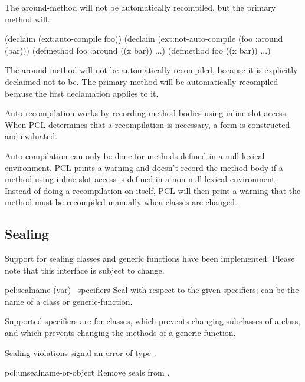 The around-method will not be automatically recompiled, but the
primary method will.

\begin{example}
(declaim (ext:auto-compile foo))
(declaim (ext:not-auto-compile (foo :around (bar)))  
(defmethod foo :around ((x bar)) ...)
(defmethod foo ((x bar)) ...)
\end{example}

The around-method will not be automatically recompiled, because it
is explicitly declaimed not to be.  The primary method will be
automatically recompiled because the first declamation applies to
it.

Auto-recompilation works by recording method bodies using inline slot
access.  When PCL determines that a recompilation is necessary, a
 form is constructed and evaluated.

Auto-compilation can only be done for methods defined in a null
lexical environment.  PCL prints a warning and doesn't record the
method body if a method using inline slot access is defined in a
non-null lexical environment.  Instead of doing a recompilation on
itself, PCL will then print a warning that the method must be
recompiled manually when classes are changed.


\subsection{Sealing}

Support for sealing classes and generic functions have been
implemented.  Please note that this interface is subject to change.

\begin{defmac}{pcl:}{seal}{name (var) \amprest\ specifiers}
  Seal  with respect to the given specifiers; 
  can be the name of a class or generic-function.

  Supported specifiers are  for classes,
  which prevents changing subclasses of a class, and 
  which prevents changing the methods of a generic function.
  
  Sealing violations signal an error of type .
\end{defmac}

\begin{defun}{pcl:}{unseal}{name-or-object}
  Remove seals from .
\end{defun}



